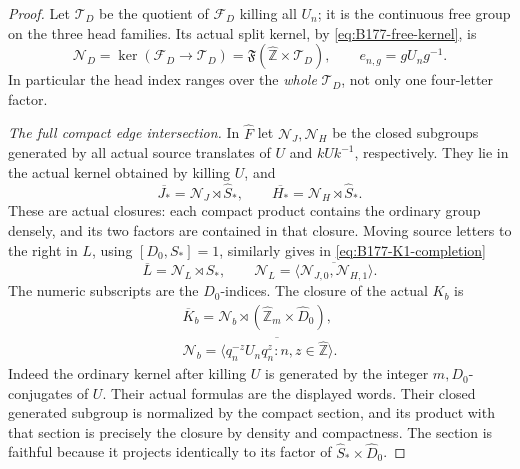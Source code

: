 \begin{proof}
Let \(\mathcal T_D\) be the quotient of \(\mathcal F_D\) killing
all \(U_n\); it is the continuous free group on the three head
families. Its actual split kernel, by
\eqref{eq:B177-free-kernel}, is
\begin{equation}\label{eq:B177-ND}
 \mathcal N_D=\ker(\mathcal F_D\to\mathcal T_D)
       =\mathfrak F(\widehat{\mathbb Z}\times\mathcal T_D),
 \qquad e_{n,g}=gU_ng^{-1}.
\end{equation}
In particular the head index ranges over the \emph{whole}
\(\mathcal T_D\), not only one four-letter factor.

\emph{The full compact edge intersection.}
In \(\widehat F\) let \(\mathcal N_J,\mathcal N_H\) be the
closed subgroups generated by all actual source translates of
\(U\) and \(kUk^{-1}\), respectively. They lie in the actual
kernel obtained by killing \(U\), and
\[
 \overline{J_*}=\mathcal N_J\rtimes\widehat S_*,\qquad
 \overline{H_*}=\mathcal N_H\rtimes\widehat S_*.
\]
These are actual closures: each compact product contains the ordinary
group densely, and its two factors are contained in that closure.
Moving source letters to the right in \(L\), using
\([D_0,S_*]=1\), similarly gives in
\eqref{eq:B177-K1-completion}
\begin{equation}\label{eq:B177-L-closure}
 \overline L=\mathcal N_L\rtimes\widehat S_*,\qquad
 \mathcal N_L=
       \overline{\langle\mathcal N_{J,0},\mathcal N_{H,1}\rangle}.
\end{equation}
The numeric subscripts are the \(D_0\)-indices.
The closure of the actual \(K_b\) is
\begin{equation}\label{eq:B177-Kb-closure}
 \begin{gathered}
 \overline K_b=
   \mathcal N_b\rtimes
       (\widehat{\mathbb Z}_m\times\widehat D_0),\\
 \mathcal N_b=
 \overline{\langle q_n^{-z}U_nq_n^z:
                       n,z\in\widehat{\mathbb Z}\rangle}.
 \end{gathered}
\end{equation}
Indeed the ordinary kernel after killing \(U\) is generated by
the integer \(m,D_0\)-conjugates of \(U\). Their actual formulas
are the displayed words. Their closed generated subgroup is
normalized by the compact section, and its product with that
section is precisely the closure by density and compactness.
The section is faithful because it projects identically to its
factor of \(\widehat S_*\times\widehat D_0\).


\end{proof}
